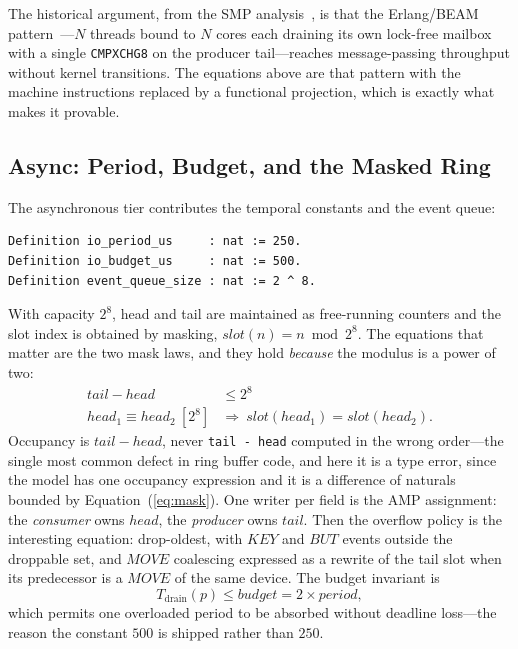\documentclass[10pt,journal,compsoc,twocolumn]{article}
\theoremstyle{definition}
\theoremstyle{remark}
\theoremstyle{plain}
\newcommand{\ctr}[1]{\texttt{#1}}
\begin{document}
The historical argument, from the SMP analysis~\cite{smp2026}, is that the Erlang/BEAM pattern~\cite{armstrong2003erlang}---\(N\) threads bound to \(N\) cores each draining its own lock-free mailbox with a single \ctr{CMPXCHG8} on the producer tail---reaches message-passing throughput without kernel transitions. The equations above are that pattern with the machine instructions replaced by a functional projection, which is exactly what makes it provable.

\subsection{Async: Period, Budget, and the Masked Ring}
The asynchronous tier contributes the temporal constants and the event queue:
\begin{lstlisting}[language=Coq]
Definition io_period_us     : nat := 250.
Definition io_budget_us     : nat := 500.
Definition event_queue_size : nat := 2 ^ 8.
\end{lstlisting}
With capacity \(2^{8}\), head and tail are maintained as free-running counters and the slot index is obtained by masking, \(\mathit{slot}(n) = n \bmod 2^{8}\). The equations that matter are the two mask laws, and they hold \emph{because} the modulus is a power of two:
\begin{equation}
\label{eq:mask}
\begin{aligned}
\mathit{tail} - \mathit{head} &\le 2^{8} \\
\mathit{head}_1 \equiv \mathit{head}_2 \ [2^{8}] &\Rightarrow\ \mathit{slot}(\mathit{head}_1) = \mathit{slot}(\mathit{head}_2).
\end{aligned}
\end{equation}
Occupancy is \( \mathit{tail}-\mathit{head} \), never \ctr{tail - head} computed in the wrong order---the single most common defect in ring buffer code, and here it is a type error, since the model has one occupancy expression and it is a difference of naturals bounded by Equation~(\ref{eq:mask}). One writer per field is the AMP assignment: the \emph{consumer} owns \(\mathit{head}\), the \emph{producer} owns \(\mathit{tail}\). Then the overflow policy is the interesting equation: drop-oldest, with \(\mathit{KEY}\) and \(\mathit{BUT}\) events outside the droppable set, and \(\mathit{MOVE}\) coalescing expressed as a rewrite of the tail slot when its predecessor is a \(\mathit{MOVE}\) of the same device. The budget invariant is
\begin{equation}
T_{\text{drain}}(p) \le \mathit{budget} = 2 \times \mathit{period},
\end{equation}
which permits one overloaded period to be absorbed without deadline loss---the reason the constant \(500\) is shipped rather than \(250\).
\end{document}
